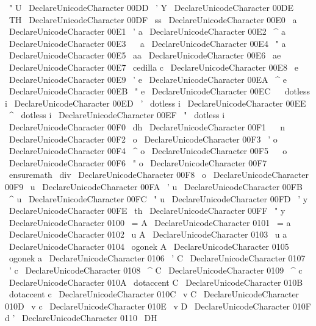 {{{{{{}
{
\
"
U
}
%
\
DeclareUnicodeCharacter
{
00DD
}
{
\
'
Y
}
%
\
DeclareUnicodeCharacter
{
00DE
}
{
\
TH
}
%
\
DeclareUnicodeCharacter
{
00DF
}
{
\
ss
}
%
%
\
DeclareUnicodeCharacter
{
00E0
}
{
\
a
}
%
\
DeclareUnicodeCharacter
{
00E1
}
{
\
'
a
}
%
\
DeclareUnicodeCharacter
{
00E2
}
{
\
^
a
}
%
\
DeclareUnicodeCharacter
{
00E3
}
{
\
~
a
}
%
\
DeclareUnicodeCharacter
{
00E4
}
{
\
"
a
}
%
\
DeclareUnicodeCharacter
{
00E5
}
{
\
aa
}
%
\
DeclareUnicodeCharacter
{
00E6
}
{
\
ae
}
%
\
DeclareUnicodeCharacter
{
00E7
}
{
\
cedilla
{
c
}
}
%
\
DeclareUnicodeCharacter
{
00E8
}
{
\
e
}
%
\
DeclareUnicodeCharacter
{
00E9
}
{
\
'
e
}
%
\
DeclareUnicodeCharacter
{
00EA
}
{
\
^
e
}
%
\
DeclareUnicodeCharacter
{
00EB
}
{
\
"
e
}
%
\
DeclareUnicodeCharacter
{
00EC
}
{
\
{
\
dotless
{
i
}
}
}
%
\
DeclareUnicodeCharacter
{
00ED
}
{
\
'
{
\
dotless
{
i
}
}
}
%
\
DeclareUnicodeCharacter
{
00EE
}
{
\
^
{
\
dotless
{
i
}
}
}
%
\
DeclareUnicodeCharacter
{
00EF
}
{
\
"
{
\
dotless
{
i
}
}
}
%
%
\
DeclareUnicodeCharacter
{
00F0
}
{
\
dh
}
%
\
DeclareUnicodeCharacter
{
00F1
}
{
\
~
n
}
%
\
DeclareUnicodeCharacter
{
00F2
}
{
\
o
}
%
\
DeclareUnicodeCharacter
{
00F3
}
{
\
'
o
}
%
\
DeclareUnicodeCharacter
{
00F4
}
{
\
^
o
}
%
\
DeclareUnicodeCharacter
{
00F5
}
{
\
~
o
}
%
\
DeclareUnicodeCharacter
{
00F6
}
{
\
"
o
}
%
\
DeclareUnicodeCharacter
{
00F7
}
{
\
ensuremath
\
div
}
%
\
DeclareUnicodeCharacter
{
00F8
}
{
\
o
}
%
\
DeclareUnicodeCharacter
{
00F9
}
{
\
u
}
%
\
DeclareUnicodeCharacter
{
00FA
}
{
\
'
u
}
%
\
DeclareUnicodeCharacter
{
00FB
}
{
\
^
u
}
%
\
DeclareUnicodeCharacter
{
00FC
}
{
\
"
u
}
%
\
DeclareUnicodeCharacter
{
00FD
}
{
\
'
y
}
%
\
DeclareUnicodeCharacter
{
00FE
}
{
\
th
}
%
\
DeclareUnicodeCharacter
{
00FF
}
{
\
"
y
}
%
%
\
DeclareUnicodeCharacter
{
0100
}
{
\
=
A
}
%
\
DeclareUnicodeCharacter
{
0101
}
{
\
=
a
}
%
\
DeclareUnicodeCharacter
{
0102
}
{
\
u
{
A
}
}
%
\
DeclareUnicodeCharacter
{
0103
}
{
\
u
{
a
}
}
%
\
DeclareUnicodeCharacter
{
0104
}
{
\
ogonek
{
A
}
}
%
\
DeclareUnicodeCharacter
{
0105
}
{
\
ogonek
{
a
}
}
%
\
DeclareUnicodeCharacter
{
0106
}
{
\
'
C
}
%
\
DeclareUnicodeCharacter
{
0107
}
{
\
'
c
}
%
\
DeclareUnicodeCharacter
{
0108
}
{
\
^
C
}
%
\
DeclareUnicodeCharacter
{
0109
}
{
\
^
c
}
%
\
DeclareUnicodeCharacter
{
010A
}
{
\
dotaccent
{
C
}
}
%
\
DeclareUnicodeCharacter
{
010B
}
{
\
dotaccent
{
c
}
}
%
\
DeclareUnicodeCharacter
{
010C
}
{
\
v
{
C
}
}
%
\
DeclareUnicodeCharacter
{
010D
}
{
\
v
{
c
}
}
%
\
DeclareUnicodeCharacter
{
010E
}
{
\
v
{
D
}
}
%
\
DeclareUnicodeCharacter
{
010F
}
{
d
'
}
%
%
\
DeclareUnicodeCharacter
{
0110
}
{
\
DH
}
}}}}}
